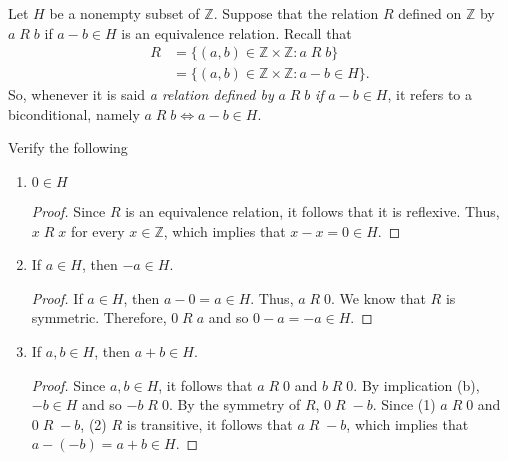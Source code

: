 \documentclass[12pt]{article}
\newcommand{\Z}{\mathbb{Z}}
\newenvironment{problem}[2][Problem]{\begin{trivlist}
		\item[\hskip \labelsep {\bfseries #1}\hskip \labelsep {\bfseries #2.}]}{\end{trivlist}}
\begin{document}
	\begin{problem}{34}
		Let $H$ be a nonempty subset of $\Z$. Suppose that the relation $R$ defined on $\Z$ by $a\; R \;b$ if $a-b \in H$ is an equivalence relation. Recall that 
		\begin{align*}
			R&=\{(a,b)\in \Z\times \Z : a\; R \;b\}\\
			&=\{(a,b)\in \Z\times \Z : a-b \in H\}.
		\end{align*}
		So, whenever it is said \textit{a relation defined by }$a\; R \;b$ \textit{if} $a-b\in H$, it refers to a biconditional, namely $a\; R \; b \iff a-b\in H$.
		
		Verify the following
		\begin{enumerate}[label=(\alph*)]
			\item $0\in H$
			\begin{proof}
				Since $R$ is an equivalence relation, it follows that it is reflexive. Thus, $x\; R \; x$ for every $x\in \Z$, which implies that $x-x=0\in H$.
			\end{proof}
			\item If $a\in H$, then $-a\in H$.
			\begin{proof}
			If $a\in H$, then $a-0=a\in H$. Thus, $a\; R \; 0$. We know that $R$ is symmetric. Therefore, $0\; R \; a$ and so $0-a = -a \in H$.
			\end{proof}
			\item If $a,b\in H$, then $a+b\in H$.
			\begin{proof}
				Since $a,b\in H$, it follows that $a\; R \; 0$ and $b\; R \;0$. By implication (b), $-b \in H$ and so $-b\; R \;0$. By the symmetry of $R$, $0\; R \; -b$. Since (1) $a\; R \; 0$ and $0\; R \; -b$, (2) $R$ is transitive, it follows that $a\; R \; -b$, which implies that $a-(-b) = a+b \in H$. 
			\end{proof}
		\end{enumerate}
	\end{problem}
\end{document}
